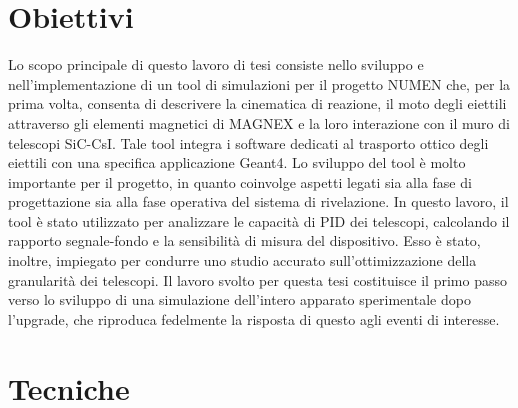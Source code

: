 \documentclass[10pt,foldmark]{leaflet}
\newcommand{\geant}{Geant4}
\begin{document}
\section{Obiettivi}
Lo scopo principale di questo lavoro di tesi consiste nello sviluppo e nell'implementazione di un tool di simulazioni per il progetto NUMEN che, per la prima volta, consenta di descrivere la cinematica di reazione, il moto degli eiettili attraverso gli elementi magnetici di MAGNEX e la loro interazione con il muro di telescopi SiC-CsI.
Tale tool integra i software dedicati al trasporto ottico degli eiettili con una specifica applicazione \geant.
Lo sviluppo del tool è molto importante per il progetto, in quanto coinvolge aspetti legati sia alla fase di progettazione sia alla fase operativa del sistema di rivelazione.
In questo lavoro, il tool è stato utilizzato per analizzare le capacità di PID dei telescopi, calcolando il rapporto segnale-fondo e la sensibilità di misura del dispositivo.
Esso è stato, inoltre, impiegato per condurre uno studio accurato sull'ottimizzazione della granularità dei telescopi.
Il lavoro svolto per questa tesi costituisce il primo passo verso lo sviluppo di una simulazione dell'intero apparato sperimentale dopo l'upgrade, che riproduca fedelmente la risposta di questo agli eventi di interesse.






\section{Tecniche}
\end{document}
